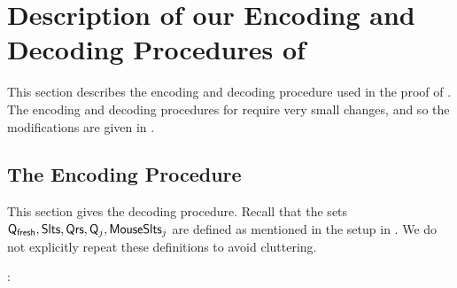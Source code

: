 \section{Description of our Encoding and Decoding Procedures of }
\label{sec:formal:MDST1}
This section describes the encoding and decoding procedure used in the proof of . The encoding and decoding procedures for  require very small changes, and so the modifications are given in . 

\subsection{The Encoding Procedure} 
This section gives the decoding procedure.  Recall that the sets $\mathsf{Q}_\textsf{fresh},\mathsf{Slts},\allowbreak\mathsf{Qrs},\allowbreak\mathsf{Q}_j,\allowbreak\mathsf{MouseSlts}_j$ are defined as mentioned in the setup in . We do not explicitly repeat these definitions to avoid cluttering.  

\medskip {}:

